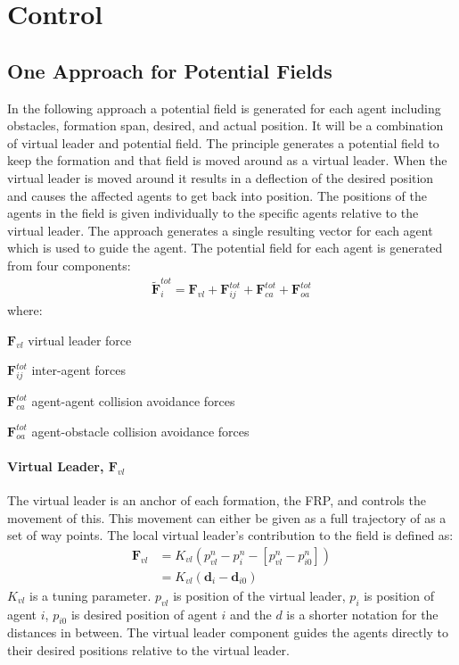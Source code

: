 \chapter{Control}
\label{ch:control}




\section{One Approach for Potential Fields}
In the following approach a potential field is generated for each
agent including obstacles, formation span, desired, and actual
position.  It will be a combination of virtual leader and potential
field. The principle generates a potential field to keep the formation
and that field is moved around as a virtual leader. When the virtual
leader is moved around it results in a deflection of the desired
position and causes the affected agents to get back into position. The
positions of the agents in the field is given individually to the
specific agents relative to the virtual leader. The approach generates
a single resulting vector for each agent which is used to guide the
agent. The potential field for each agent is generated from four
components:
\begin{align}
\tilde{\mathbf{F}}_i^{tot} = \mathbf{F}_{vl}+\mathbf{F}_{ij}^{tot}+\mathbf{F}_{ca}^{tot}+\mathbf{F}_{oa}^{tot}
\end{align}
where:
\begin{ffk}
\firmlist%
\item[$\mathbf{F}_{vl}$] virtual leader force
\item[$\mathbf{F}_{ij}^{tot}$] inter-agent forces
\item[$\mathbf{F}_{ca}^{tot}$] agent-agent collision avoidance forces
\item[$\mathbf{F}_{oa}^{tot}$] agent-obstacle collision avoidance forces
\end{ffk}

\subsubsection{Virtual Leader, $\mathbf{F}_{vl}$}
The virtual leader is an anchor of each formation, the \ac{FRP}, and
controls the movement of this. This movement can either be given as a
full trajectory of as a set of way points. The local virtual leader's
contribution to the field is defined as:
\begin{align}
\mathbf{F}_{vl} &= K_{vl}(p_{vl}^n-p_i^n-[p_{vl}^n-p_{i0}^n])\\
&= K_{vl}(\mathbf{d}_i-\mathbf{d}_{i0})
\end{align}
$K_{vl}$ is a tuning parameter. $p_{vl}$ is position of the virtual
leader, $p_i$ is position of agent $i$, $p_{i0}$ is desired position
of agent $i$ and the $d$ is a shorter notation for the distances in
between. The virtual leader component guides the agents directly to
their desired positions relative to the virtual leader.

